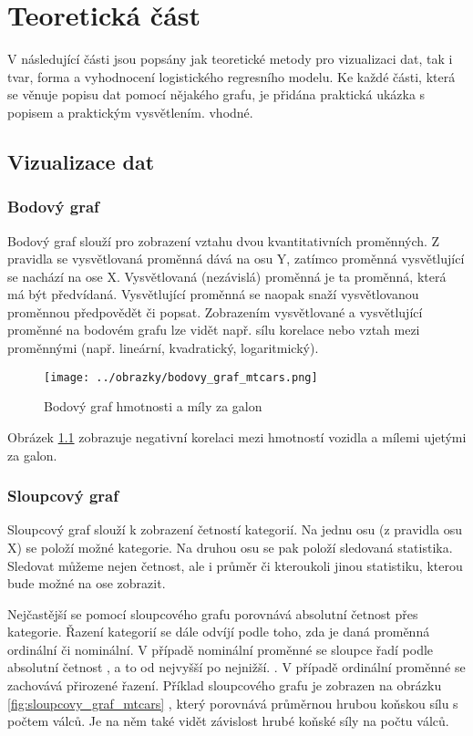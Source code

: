 \chapter{Teoretická část}
V následující části jsou popsány jak teoretické metody pro vizualizaci dat, tak i tvar, forma a vyhodnocení logistického regresního modelu. 
Ke každé části, která se věnuje popisu dat pomocí nějakého grafu, je přidána praktická ukázka s popisem a praktickým vysvětlením.
vhodné.

\section{Vizualizace dat} \label{sec:vizualizace_dat}
\subsection{Bodový graf}
Bodový graf slouží pro zobrazení vztahu dvou kvantitativních proměnných. Z pravidla se vysvětlovaná proměnná dává na osu Y,
zatímco proměnná vysvětlující se nachází na ose X. Vysvětlovaná (nezávislá) proměnná je ta proměnná, která má být předvídaná.
Vysvětlující proměnná se naopak snaží vysvětlovanou proměnnou předpovědět či popsat. 
{\color{red}
Zobrazením
} vysvětlované a vysvětlující proměnné
na bodovém grafu lze vidět např. sílu korelace nebo vztah mezi proměnnými (např. lineární, kvadratický, logaritmický).

\begin{figure}[H]
    \centering
    \texttt{[image: ../obrazky/bodovy\_graf\_mtcars.png]}
    \caption{Bodový graf hmotnosti a míly za galon} 
    \label{fig:bodovy_graf_mtcars}
\end{figure}

Obrázek \ref{fig:bodovy_graf_mtcars} zobrazuje negativní korelaci mezi hmotností vozidla a mílemi ujetými za galon.

\subsection{Sloupcový graf}
Sloupcový graf slouží k zobrazení
{\color{red}
četností
} kategorií. Na jednu osu (z pravidla osu X) se položí možné kategorie. Na druhou osu
se pak položí sledovaná statistika.
Sledovat můžeme nejen četnost, ale i průměr či kteroukoli jinou statistiku, kterou bude možné na ose zobrazit.


Nejčastější se pomocí sloupcového grafu porovnává absolutní četnost přes kategorie. Řazení kategorií se dále odvíjí podle toho, zda je
daná proměnná ordinální či nominální. V případě nominální proměnné se sloupce řadí podle absolutní četnost
{\color{red}
, a to od nejvyšší po nejnižší.
}
. V případě ordinální
proměnné se zachovává přirozené řazení.
Příklad sloupcového grafu je zobrazen na obrázku 
{\color{red}
\ref{fig:sloupcovy_graf_mtcars}
}, který porovnává průměrnou hrubou koňskou sílu s počtem válců.
Je na něm také vidět závislost hrubé koňské síly na počtu válců.

